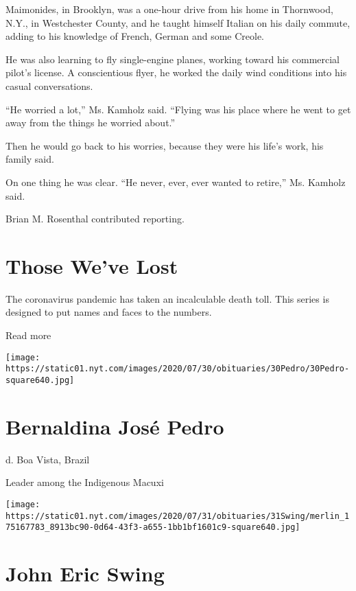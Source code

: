 Maimonides, in Brooklyn, was a one-hour drive from his home in
Thornwood, N.Y., in Westchester County, and he taught himself Italian on
his daily commute, adding to his knowledge of French, German and some
Creole.

He was also learning to fly single-engine planes, working toward his
commercial pilot's license. A conscientious flyer, he worked the daily
wind conditions into his casual conversations.

``He worried a lot,'' Ms. Kamholz said. ``Flying was his place where he
went to get away from the things he worried about.''

Then he would go back to his worries, because they were his life's work,
his family said.

On one thing he was clear. ``He never, ever, ever wanted to retire,''
Ms. Kamholz said.

Brian M. Rosenthal contributed reporting.

\href{https://www.nytimes.com/interactive/2020/obituaries/people-died-coronavirus-obituaries.html?action=click\&pgtype=Article\&state=default\&region=BELOW_MAIN_CONTENT\&context=covid_obits_promo}{}

\hypertarget{those-weve-lost}{%
\section{Those We've Lost}\label{those-weve-lost}}

The coronavirus pandemic has taken an incalculable death toll. This
series is designed to put names and faces to the numbers.

Read more

\texttt{[image: https://static01.nyt.com/images/2020/07/30/obituaries/30Pedro/30Pedro-square640.jpg]}

\hypertarget{bernaldina-josuxe9-pedro}{%
\section{Bernaldina José Pedro}\label{bernaldina-josuxe9-pedro}}

d. Boa Vista, Brazil

Leader among the Indigenous Macuxi

\texttt{[image: https://static01.nyt.com/images/2020/07/31/obituaries/31Swing/merlin\_175167783\_8913bc90-0d64-43f3-a655-1bb1bf1601c9-square640.jpg]}

\hypertarget{john-eric-swing}{%
\section{John Eric Swing}\label{john-eric-swing}}

